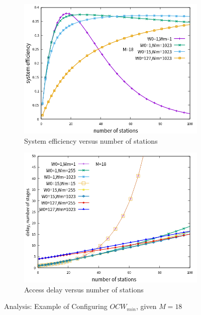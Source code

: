 \begin{figure}[!t]
\centering
\begin{subfigure}{\textwidth}  
  \centering  
  \includegraphics[scale=0.85]{./figure/chp4/M18/n_eff_perf_Wm1023.png}  
    \caption{System efficiency versus number of stations}   
    \label{fig_n_eff_W0}
\end{subfigure}   

\begin{subfigure}{\textwidth}
	\centering
\includegraphics[scale=.85]{./figure/chp4/M18/n_delay_perf.png}
\caption{Access delay versus number of stations}
\label{fig_n_delay_W0}
\end{subfigure}
\caption{Analysis: Example of Configuring $OCW_{min}$, given $M=18$}
\end{figure}

